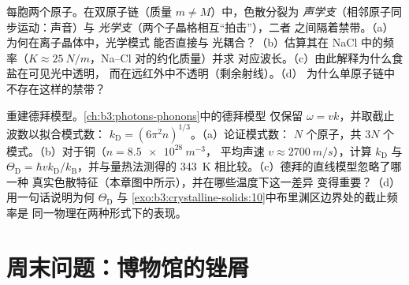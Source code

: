 \begin{exercise}[$\star\star\star$]\label{exo:b3:crystalline-solids:11}
每胞两个原子。在双原子链（质量 $m \ne M$）中，色散分裂为
\emph{声学支}（相邻原子同步运动：声音）与
\emph{光学支}（两个子晶格相互“拍击”），二者
之间隔着禁带。（a）为何在离子晶体中，光学模式
能否直接与
光耦合？（b）估算其在 NaCl 中的频率（$K \approx
\qty{25}{N/m}$，Na--Cl 对的约化质量）并求
对应波长。（c）由此解释为什么食盐在可见光中透明，
而在远红外中不透明（剩余射线）。（d）
为什么单原子链中不存在这样的禁带？
\end{exercise}

\begin{exercise}[$\star\star\star$]\label{exo:b3:crystalline-solids:12}
重建德拜模型。\cref{ch:b3:photons-phonons}中的德拜模型
仅保留 $\omega = vk$，并取截止波数以拟合模式数：
$k_{\text{D}} = (6\pi^2n)^{1/3}$。（a）论证模式数：
$N$ 个原子，共 $3N$ 个模式。（b）对于铜（$n = \qty{8.5e28}{m^{-3}}$，
平均声速 $v \approx \qty{2700}{m/s}$），计算
$k_{\text{D}}$ 与 $\Theta_{\text{D}} =
\hbar vk_{\text{D}}/k_{\text{B}}$，并与量热法测得的
\qty{343}{K} 相比较。（c）德拜的直线模型忽略了哪一种
真实色散特征（本章图中所示），并在哪些温度下这一差异
变得重要？（d）用一句话说明为何
$\Theta_{\text{D}}$ 与
\cref{exo:b3:crystalline-solids:10}中布里渊区边界处的截止频率是
同一物理在两种形式下的表现。
\end{exercise}

\section{周末问题：博物馆的锉屑}

